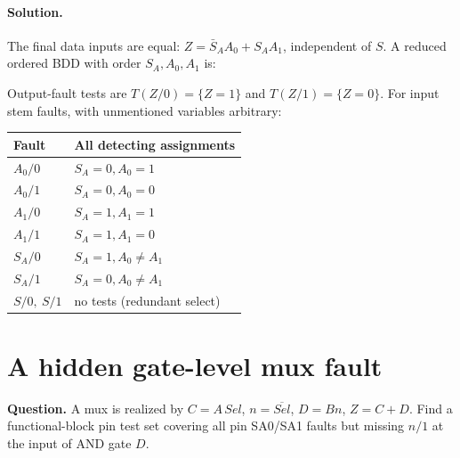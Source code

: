 \documentclass[11pt]{article}
\newcommand{\sol}{\paragraph{Solution.}}
\begin{document}
\sol The final data inputs are equal:
$Z=\bar S_A A_0+S_A A_1$, independent of $S$.
A reduced ordered BDD with order $S_A,A_0,A_1$ is:
\begin{center}\end{center}
Output-fault tests are $T(Z/0)=\{Z=1\}$ and $T(Z/1)=\{Z=0\}$.
For input stem faults, with unmentioned variables arbitrary:
\begin{center}\begin{tabular}{ll}\toprule Fault & All detecting assignments\\\midrule
$A_0/0$ & $S_A=0,A_0=1$\\
$A_0/1$ & $S_A=0,A_0=0$\\
$A_1/0$ & $S_A=1,A_1=1$\\
$A_1/1$ & $S_A=1,A_1=0$\\
$S_A/0$ & $S_A=1,A_0\ne A_1$\\
$S_A/1$ & $S_A=0,A_0\ne A_1$\\
$S/0,\ S/1$ & no tests (redundant select)\\\bottomrule
\end{tabular}\end{center}

\section{A hidden gate-level mux fault}
\textbf{Question.} A mux is realized by $C=A\,Sel$, $n=\overline{Sel}$,
$D=B n$, $Z=C+D$. Find a functional-block pin test set covering all
pin SA0/SA1 faults but missing $n/1$ at the input of AND gate $D$.
\begin{center}\end{center}
\end{document}
